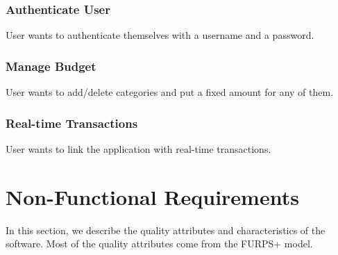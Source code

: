 \documentclass[12pt]{article}
\begin{document}
\subsubsection{Authenticate User}
User wants to authenticate themselves with a username and a password.

\subsubsection{Manage Budget}
User wants to add/delete categories and put a fixed amount for any of them. 

\subsubsection{Real-time Transactions}
User wants to link the application with real-time transactions.


\section{Non-Functional Requirements}
In this section, we describe the quality attributes and characteristics of the software. Most of the quality attributes come from the FURPS+ model.
\end{document}
